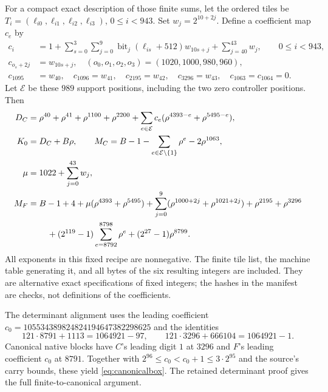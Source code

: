 \documentclass[11pt]{article}
\begin{document}
For a compact exact description of those finite sums, let the ordered tiles
be $T_i=(\ell_{i0},\ell_{i1},\ell_{i2},\ell_{i3})$, $0\le i<943$.
Set $w_j=2^{10+2j}$. Define a coefficient map $c_e$ by
\begin{align*}
 c_i&=1+\sum_{s=0}^3\sum_{j=0}^9
        \operatorname{bit}_j(\ell_{is}+512)w_{10s+j}
        +\sum_{j=40}^{43}w_j,\qquad 0\le i<943,\\
 c_{o_s+2j}&=w_{10s+j},\quad(o_0,o_1,o_2,o_3)=(1020,1000,980,960),\\
 c_{1095}&=w_{40},\quad c_{1096}=w_{41},\quad
 c_{2195}=w_{42},\quad c_{3296}=w_{43},\quad c_{1063}=c_{1064}=0.
\end{align*}
Let $\mathcal E$ be these $989$ support positions, including the two zero
controller positions. Then
\begin{align*}
 D_C&=\rho^{40}+\rho^{41}+\rho^{1100}+\rho^{2200}
       +\sum_{e\in\mathcal E}c_e(\rho^{4393-e}+\rho^{5495-e}),\\
 K_0&=D_C+B\rho,\qquad
 M_C=B-1-\sum_{e\in\mathcal E\setminus\{1\}}\rho^e-2\rho^{1063},\\
 \mu&=1022+\sum_{j=0}^{43}w_j,\\
 M_F&=B-1+4+\mu(\rho^{4393}+\rho^{5495})
       +\sum_{j=0}^9(\rho^{1000+2j}+\rho^{1021+2j})
       +\rho^{2195}+\rho^{3296}\\
    &\hspace{8mm}+(2^{119}-1)\sum_{e=8792}^{8798}\rho^e
       +(2^{27}-1)\rho^{8799}.
\end{align*}
All exponents in this fixed recipe are nonnegative. The finite tile list,
the machine table generating it, and all bytes of the six resulting integers
are included. They are alternative exact specifications of fixed integers;
the hashes in the manifest are checks, not definitions of the coefficients.

The determinant alignment uses the leading coefficient
$c_0=105534389824824194647382298625$ and the identities
\[
 121\cdot8791+1113=1064921-97,\qquad
 121\cdot3296+666104=1064921-1.
\]
Canonical native blocks have $C$'s leading digit $1$ at $3296$ and $F$'s
leading coefficient $c_0$ at $8791$. Together with
$2^{96}\le c_0<c_0+1\le3\cdot2^{95}$ and the source's carry bounds,
these yield \eqref{eq:canonicalbox}. The retained determinant proof gives
the full finite-to-canonical argument.
\end{document}
